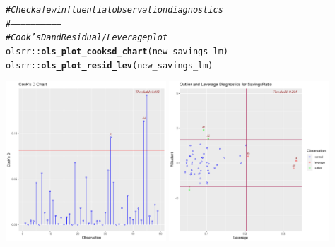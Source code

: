 \documentclass{article}\usepackage[]{graphicx}\usepackage[]{color}
\makeatletter
\newcommand{\hlcom}[1]{\textcolor[rgb]{0.678,0.584,0.686}{\textit{#1}}}%
\newcommand{\hlopt}[1]{\textcolor[rgb]{0,0,0}{#1}}%
\newcommand{\hlstd}[1]{\textcolor[rgb]{0.345,0.345,0.345}{#1}}%
\newcommand{\hlkwd}[1]{\textcolor[rgb]{0.737,0.353,0.396}{\textbf{#1}}}%
\newenvironment{kframe}{%
 \def\at@end@of@kframe{}%
 \ifinner\ifhmode%
  \def\at@end@of@kframe{\end{minipage}}%
  \begin{minipage}{\columnwidth}%
 \fi\fi%
 \def\FrameCommand##1{\hskip\@totalleftmargin \hskip-\fboxsep
 \colorbox{shadecolor}{##1}\hskip-\fboxsep
     \hskip-\linewidth \hskip-\@totalleftmargin \hskip\columnwidth}%
 \MakeFramed {\advance\hsize-\width
   \@totalleftmargin\z@ \linewidth\hsize
   \@setminipage}}%
 {\par\unskip\endMakeFramed%
 \at@end@of@kframe}
\newenvironment{knitrout}{}{} %
\makeatother
\begin{document}
\begin{knitrout}
\color{fgcolor}\begin{kframe}
\begin{alltt}
\hlcom{# Check a few influential observation diagnostics}
\hlcom{# ------------------------------}
\hlcom{# Cook's D and Residual / Leverage plot}
\hlstd{olsrr}\hlopt{::}\hlkwd{ols_plot_cooksd_chart}\hlstd{(new_savings_lm)}
\hlstd{olsrr}\hlopt{::}\hlkwd{ols_plot_resid_lev}\hlstd{(new_savings_lm)}
\end{alltt}
\end{kframe}

{\centering \includegraphics[width=0.45\textwidth]{figure/unnamed-chunk-10-1} 
\includegraphics[width=0.45\textwidth]{figure/unnamed-chunk-10-2} 

}



\end{knitrout}
\end{document}
